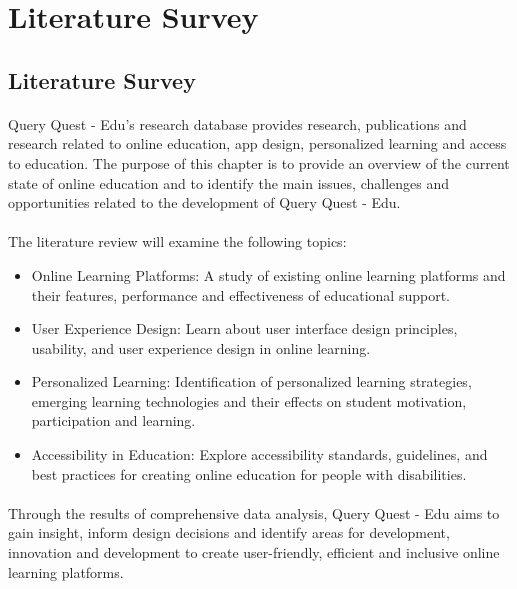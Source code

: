 \section{Literature Survey}
\subsection{Literature Survey}
\paragraph{}Query Quest - Edu's research database provides research, publications and research related to online education, app design, personalized learning and access to education. The purpose of this chapter is to provide an overview of the current state of online education and to identify the main issues, challenges and opportunities related to the development of Query Quest - Edu.


\paragraph{}The literature review will examine the following topics: 

\begin{itemize}
\item Online Learning Platforms: A study of existing online learning platforms and their features, performance and effectiveness of educational support.

\item User Experience Design: Learn about user interface design principles, usability, and user experience design in online learning.

\item Personalized Learning: Identification of personalized learning strategies, emerging learning technologies and their effects on student motivation, participation and learning.

\item Accessibility in Education: Explore accessibility standards, guidelines, and best practices for creating online education for people with disabilities.
\end{itemize} 

\paragraph{}Through the results of comprehensive data analysis, Query Quest - Edu aims to gain insight, inform design decisions and identify areas for development, innovation and development to create user-friendly, efficient and inclusive online learning platforms.



